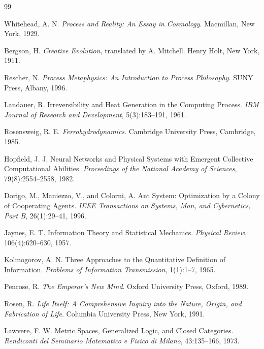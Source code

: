 \documentclass[11pt,openany]{book}
\theoremstyle{plain}
\theoremstyle{definition}
\theoremstyle{remark}
\begin{document}
\begingroup
\small
{}
\begin{thebibliography}{99}

Whitehead, A. N.
\newblock \emph{Process and Reality: An Essay in Cosmology}.
\newblock Macmillan, New York, 1929.

Bergson, H.
\newblock \emph{Creative Evolution}, translated by A. Mitchell.
\newblock Henry Holt, New York, 1911.

Rescher, N.
\newblock \emph{Process Metaphysics: An Introduction to Process Philosophy}.
\newblock SUNY Press, Albany, 1996.

Landauer, R.
\newblock Irreversibility and Heat Generation in the Computing Process.
\newblock \emph{IBM Journal of Research and Development}, 5(3):183--191, 1961.

Rosensweig, R. E.
\newblock \emph{Ferrohydrodynamics}.
\newblock Cambridge University Press, Cambridge, 1985.

Hopfield, J. J.
\newblock Neural Networks and Physical Systems with Emergent Collective Computational Abilities.
\newblock \emph{Proceedings of the National Academy of Sciences}, 79(8):2554--2558, 1982.

Dorigo, M., Maniezzo, V., and Colorni, A.
\newblock Ant System: Optimization by a Colony of Cooperating Agents.
\newblock \emph{IEEE Transactions on Systems, Man, and Cybernetics, Part B}, 26(1):29--41, 1996.

Jaynes, E. T.
\newblock Information Theory and Statistical Mechanics.
\newblock \emph{Physical Review}, 106(4):620--630, 1957.

Kolmogorov, A. N.
\newblock Three Approaches to the Quantitative Definition of Information.
\newblock \emph{Problems of Information Transmission}, 1(1):1--7, 1965.

Penrose, R.
\newblock \emph{The Emperor's New Mind}.
\newblock Oxford University Press, Oxford, 1989.

Rosen, R.
\newblock \emph{Life Itself: A Comprehensive Inquiry into the Nature, Origin, and Fabrication of Life}.
\newblock Columbia University Press, New York, 1991.

Lawvere, F. W.
\newblock Metric Spaces, Generalized Logic, and Closed Categories.
\newblock \emph{Rendiconti del Seminario Matematico e Fisico di Milano}, 43:135--166, 1973.


\end{thebibliography}
\end{document}

